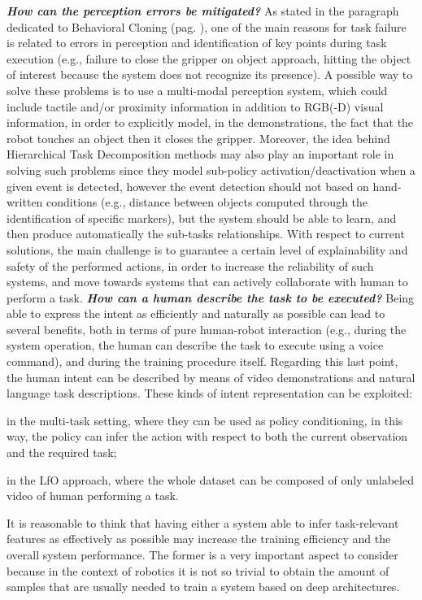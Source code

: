 \newline \textbf{\textit{How can the perception errors be mitigated?}} As stated in the paragraph dedicated to Behavioral Cloning (pag. \pageref{sec:lfo}), one of the main reasons for task failure is related to errors in perception and identification of key points during task execution (e.g., failure to close the gripper on object approach, hitting the object of interest because the system does not recognize its presence). A possible way to solve these problems is to use a multi-modal perception system, which could include tactile and/or proximity information in addition to RGB(-D) visual information, in order to explicitly model, in the demonstrations, the fact that the robot touches an object then it closes the gripper. Moreover, the idea behind Hierarchical Task Decomposition methods may also play an important role in solving such problems since they model sub-policy activation/deactivation when a given event is detected, however the event detection should not based on hand-written conditions (e.g., distance between objects computed through the identification of specific markers), but the system should be able to learn, and then produce automatically the sub-tasks relationships. With respect to current solutions, the main challenge is to guarantee a certain level of explainability and safety of the performed actions, in order to increase the reliability of such systems, and move towards systems that can actively collaborate with human to perform a task.
\newline \textbf{\textit{How can a human describe the task to be executed?}} Being able to express the intent as efficiently and naturally as possible can lead to several benefits, both in terms of pure human-robot interaction (e.g., during the system operation, the human can describe the task to execute using a voice command), and during the training procedure itself. Regarding this last point, the human intent can be described by means of video demonstrations and natural language task descriptions. These kinds of intent representation can be exploited: \begin{enumerate*}[label=\textbf{(\arabic*)}]
    \item in the multi-task setting, where they can be used as policy conditioning, in this way, the policy can infer the action with respect to both the current observation and the required task;
    \item in the LfO approach, where the whole dataset can be composed of only unlabeled video of human performing a task.
\end{enumerate*} 
It is reasonable to think that having either a system able to infer task-relevant features as effectively as possible may increase the training efficiency and the overall system performance. The former is a very important aspect to consider because in the context of robotics it is not so trivial to obtain the amount of samples that are usually needed to train a system based on deep architectures.

